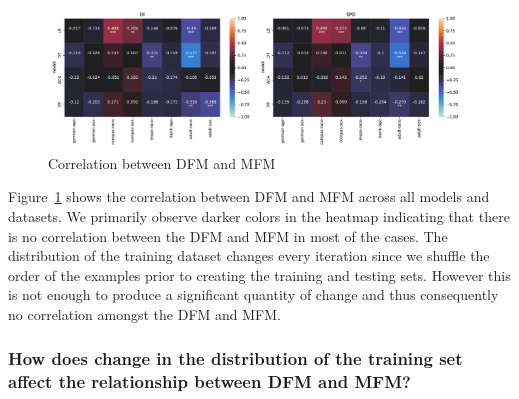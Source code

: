 \documentclass{article}
\begin{document}


\begin{figure}
  \centering
  \includegraphics[width=0.95\linewidth]{heatmap--corr--full-data.pdf}
  \caption{Correlation between DFM and MFM}
  \label{fig:heatmap--corr--full-data}
\end{figure}

Figure \ref{fig:heatmap--corr--full-data} shows the correlation
between DFM and MFM across all models and datasets. We primarily
observe darker colors in the heatmap indicating that there is no
correlation between the DFM and MFM in most of the cases. The
distribution of the training dataset changes every iteration since we
shuffle the order of the examples prior to creating the training and
testing sets. However this is not enough to produce a significant
quantity of change and thus consequently no correlation amongst the
DFM and MFM.

\subsubsection{How does change in the distribution of the training set
  affect the relationship between DFM and MFM?}\label{sec:results-full-rel-dist}
\end{document}
